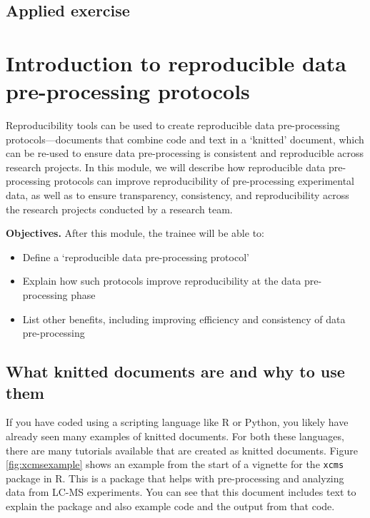 \documentclass[]{tufte-book}
\providecommand{\tightlist}{%
  \setlength{\itemsep}{0pt}\setlength{\parskip}{0pt}}
\begin{document}
\hypertarget{applied-exercise-6}{%
\subsection{Applied exercise}\label{applied-exercise-6}}

\hypertarget{introduction-to-reproducible-data-pre-processing-protocols}{%
\section{Introduction to reproducible data pre-processing protocols}\label{introduction-to-reproducible-data-pre-processing-protocols}}

Reproducibility tools can be used to create reproducible data pre-processing
protocols---documents that combine code and text in a `knitted' document, which
can be re-used to ensure data pre-processing is consistent and reproducible
across research projects. In this module, we will describe how reproducible data
pre-processing protocols can improve reproducibility of pre-processing
experimental data, as well as to ensure transparency, consistency, and
reproducibility across the research projects conducted by a research team.

\textbf{Objectives.} After this module, the trainee will be able to:

\begin{itemize}
\tightlist
\item
  Define a `reproducible data pre-processing protocol'
\item
  Explain how such protocols improve reproducibility at the data pre-processing
  phase
\item
  List other benefits, including improving efficiency and consistency of data
  pre-processing
\end{itemize}

\hypertarget{what-knitted-documents-are-and-why-to-use-them}{%
\subsection{What knitted documents are and why to use them}\label{what-knitted-documents-are-and-why-to-use-them}}

If you have coded using a scripting language like R or Python, you likely have
already seen many examples of knitted documents. For both these languages, there
are many tutorials available that are created as knitted documents. Figure
\ref{fig:xcmsexample} shows an example from the start of a vignette for the
\texttt{xcms} package in R. This is a package that helps with pre-processing and
analyzing data from LC-MS experiments. You can see that this document includes
text to explain the package and also example code and the output from that code.
\end{document}
